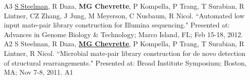 \begin{cvpubs}
    {A3} %
  \cvpub
    {\underline{S Steelman}, R Daza, \textbf{MG Chevrette}, P Kompella, P Trang, T Surabian, R Lintner, CZ Zhang, J Jung, M Meyerson, C Nusbaum, R Nicol. ``Automated low input mate-pair library construction for Illumina sequencing." Presented at: Advances in Genome Biology \& Technology; Marco Island, FL; Feb 15-18, 2012.} %
    {A2} %
  \cvpub
    {S Steelman, R Daza, \underline{\textbf{MG Chevrette}}, P Kompella, P Trang, T Surabian, R Lintner, R Nicol. ``Microbial mate-pair library construction for de novo detection of structural rearrangements." Presented at: Broad Institute Symposium; Boston, MA; Nov 7-8, 2011.} %
    {A1} %
\end{cvpubs}